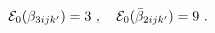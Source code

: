 \begin{equation}\label{eng7}
{\cal E}_0(\beta_{3ijk'}) = 3 ~,~~~
{\cal E}_0(\bar\beta_{2ijk'}) = 9 ~.
\end{equation}

